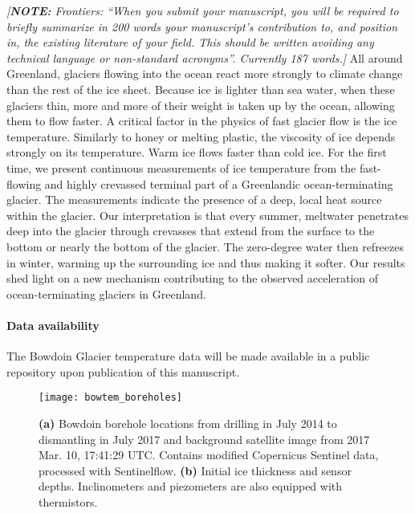 \documentclass[utf8]{article}
\newcommand{\note}[1]{\textcolor{c0}{\emph{[\textbf{NOTE:} #1]}}}
\begin{document}
    \note{Frontiers: ``When you submit your manuscript, you will be required to
          briefly summarize in 200 words your manuscript’s contribution to, and
          position in, the existing literature of your field. This should be
          written avoiding any technical language or non-standard acronyms''.
          Currently 187 words.}
    All around Greenland, glaciers flowing into the ocean react more strongly
    to climate change than the rest of the ice sheet. Because ice is lighter
    than sea water, when these glaciers thin, more and more of their weight is
    taken up by the ocean, allowing them to flow faster. A critical factor in
    the physics of fast glacier flow is the ice temperature. Similarly to honey
    or melting plastic, the viscosity of ice depends strongly on its
    temperature. Warm ice flows faster than cold ice.
    For the first time, we present continuous measurements of ice
    temperature from the fast-flowing and highly crevassed terminal part of a
    Greenlandic ocean-terminating glacier. The measurements indicate the
    presence of a deep, local heat source within the glacier. Our
    interpretation is that every summer, meltwater penetrates deep into the
    glacier through crevasses that extend from the surface to the bottom or
    nearly the bottom of the glacier. The zero-degree water then refreezes in
    winter, warming up the surrounding ice and thus making it softer.
    Our results shed light on a new mechanism contributing to the observed
    acceleration of ocean-terminating glaciers in Greenland.


\paragraph{Data availability}

    The Bowdoin Glacier temperature data will be made available in a public
    repository upon publication of this manuscript.







\clearpage

    \begin{figure}
      \centerline{\texttt{[image: bowtem\_boreholes]}}
      \caption{%
        \textbf{(a)} Bowdoin borehole locations from drilling in July 2014 to
          dismantling in July 2017 and background satellite image from 2017
          Mar. 10, 17:41:29 UTC. Contains modified Copernicus Sentinel data,
          processed with Sentinelflow.
        \textbf{(b)} Initial ice thickness and sensor depths. Inclinometers
          and piezometers are also equipped with thermistors.}
      \label{fig:boreholes}
    \end{figure}
\end{document}
